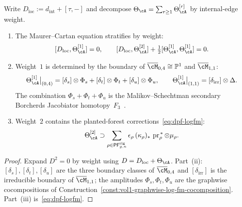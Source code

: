 \begin{proposition}
\label{prop:vol1-first-two-weights-log-fm}
Write $D_{\mathrm{loc}}:=d_{\mathrm{int}}+[\tau,-]$ and decompose
$\Theta_\cA=\sum_{r\ge 1}\Theta_\cA^{[r]}$ by internal-edge
weight.
\begin{enumerate}[label=\textup{(\roman*)}]
\item The Maurer--Cartan equation stratifies by weight:
\begin{equation}
\label{eq:first-two-weight-mc-relations}
[D_{\mathrm{loc}},\Theta_\cA^{[1]}]=0,
\qquad
[D_{\mathrm{loc}},\Theta_\cA^{[2]}]
+\tfrac12[\Theta_\cA^{[1]},\Theta_\cA^{[1]}]=0.
\end{equation}
\item Weight~$1$ is determined by the boundary of
$\overline{\cM}_{0,4}\cong\mathbb P^1$ and
$\overline{\cM}_{1,1}$:
\begin{equation}
\label{eq:weight-one-boundary-terms}
\Theta_\cA^{[1]}\big|_{(0,4)}
=
[\delta_s]\otimes\Phi_s
+
[\delta_t]\otimes\Phi_t
+
[\delta_u]\otimes\Phi_u,
\qquad
\Theta_\cA^{[1]}\big|_{(1,1)}
=
[\delta_{\mathrm{irr}}]\otimes\Delta .
\end{equation}
The combination $\Phi_s+\Phi_t+\Phi_u$ is the
Malikov--Schechtman secondary Borcherds Jacobiator
homotopy~$F_3$~\cite[\S3.2]{MS24}.
\item Weight~$2$ contains the planted-forest
corrections~\eqref{eq:dpf-logfm}:
\begin{equation}
\label{eq:weight-two-log-term}
\Theta_\cA^{[2]}
\supset
\sum_{\rho\in \mathsf{PF}^{\mathrm{rig}}_{g,n}}
\epsilon_\rho\,
(\kappa_\rho)_*\,\operatorname{pr}_\rho^{\,*}\otimes\mu_\rho .
\end{equation}
\end{enumerate}
\end{proposition}

\begin{proof}
Expand $D^2=0$ by weight using $D=D_{\mathrm{loc}}+\Theta_\cA$.
Part~(ii):
$[\delta_s],[\delta_t],[\delta_u]$ are the three
boundary classes of $\overline{\cM}_{0,4}$ and
$[\delta_{\mathrm{irr}}]$ is the irreducible boundary of
$\overline{\cM}_{1,1}$; the amplitudes $\Phi_s,\Phi_t,\Phi_u$
are the graphwise cocompositions of
Construction~\ref{const:vol1-graphwise-log-fm-cocomposition}.
Part~(iii) is~\eqref{eq:dpf-logfm}.
\end{proof}

